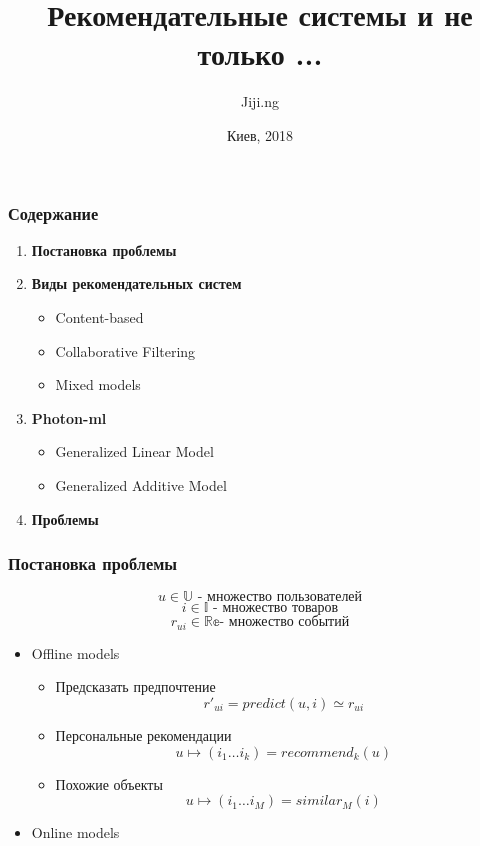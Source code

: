 \documentclass[14pt]{beamer}
\title{\small{Рекомендательные системы и не только ...}}
\author{
		Jiji.ng%
		\vspace{20pt}%
	}
\date{\small{Киев, 2018}}
\begin{document}
		
		\maketitle
		\begin{frame}
			\frametitle{Содержание}
			\begin{enumerate}
				\item \textbf{Постановка проблемы}
				\item \textbf{Виды рекомендательных систем}
				\begin{itemize}
					\item Content-based
					\item Collaborative Filtering
					\item Mixed models
				\end{itemize}
				\item \textbf{Photon-ml}
				\begin{itemize}
					\item Generalized Linear Model
					\item Generalized Additive Model
				\end{itemize}
				\item \textbf{Проблемы}
			\end{enumerate}
		\end{frame}
				
		\begin{frame}
			\frametitle{Постановка проблемы}
				
				$$ u \in \mathbb{U} \text{ - множество пользователей}$$ 
				$$ i \in \mathbb{I} \text{ - множество товаров}$$ 
				$$ r_{ui} \in \mathbb{Re} \text{- множество событий}$$ 	
			\begin{itemize}
				\item Offline models
				\begin{itemize}
					\item Предсказать предпочтение 
					$$ r'_{ui} = predict(u,i) \simeq r_{ui}$$
					\item Персональные рекомендации
					$$ u \longmapsto (i_1 \dots i_k) = recommend_k(u)$$
					\item Похожие объекты
					$$ u \longmapsto (i_1 \dots i_M) = similar_M(i)$$
				\end{itemize}
				\item Online models
			\end{itemize}	
		\end{frame}
		
\end{document}
